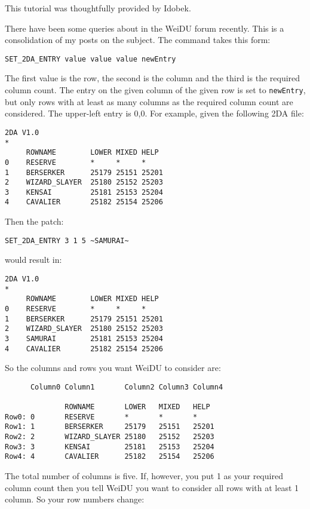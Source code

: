 \documentclass{article}
\def\ttref#1{\ahrefloc{#1}{\tt #1}}
\def\t#1{{\tt #1}}
\begin{document}
This tutorial was thoughtfully provided by Idobek.

There have been some queries about \ttref{SET!2DA!ENTRY} in the WeiDU
forum recently. This is a consolidation of my posts on the subject.
The command takes this form:

\begin{verbatim}
SET_2DA_ENTRY value value value newEntry
\end{verbatim}

The first value is the row, the second is the column and the third is the
required column count. The entry on the given column of the given row is
set to \t{newEntry}, but only rows with at least as many columns as the
required column count are considered. The upper-left entry is 0,0. For
example, given the following 2DA file:

\begin{verbatim}
2DA V1.0
*
     ROWNAME        LOWER MIXED HELP
0    RESERVE        *     *     *
1    BERSERKER      25179 25151 25201
2    WIZARD_SLAYER  25180 25152 25203
3    KENSAI         25181 25153 25204
4    CAVALIER       25182 25154 25206
\end{verbatim}

Then the patch:

\begin{verbatim}
SET_2DA_ENTRY 3 1 5 ~SAMURAI~
\end{verbatim}

would result in:

\begin{verbatim}
2DA V1.0
*
     ROWNAME        LOWER MIXED HELP
0    RESERVE        *     *     *
1    BERSERKER      25179 25151 25201
2    WIZARD_SLAYER  25180 25152 25203
3    SAMURAI        25181 25153 25204
4    CAVALIER       25182 25154 25206
\end{verbatim}

So the columns and rows you want WeiDU to consider are:

\begin{verbatim}
      Column0 Column1       Column2 Column3 Column4

              ROWNAME       LOWER   MIXED   HELP
Row0: 0       RESERVE       *       *       *
Row1: 1       BERSERKER     25179   25151   25201
Row2: 2       WIZARD_SLAYER 25180   25152   25203
Row3: 3       KENSAI        25181   25153   25204
Row4: 4       CAVALIER      25182   25154   25206
\end{verbatim}

The total number of columns is five. If, however, you put 1 as your
required column count then you tell WeiDU you want to consider all rows
with at least 1 column. So your row numbers change:
\end{document}
